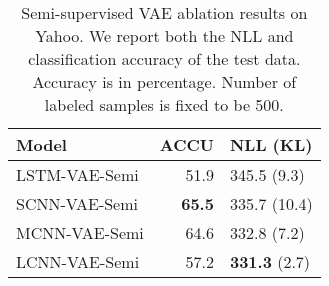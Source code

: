 \documentclass{article}
\begin{document}
\begin{table}[!thp]
\small
  \centering
  \begin{tabular}{l r l}
    Model & ACCU & NLL (KL) \\
    \toprule
    LSTM-VAE-Semi & 51.9 & 345.5 (9.3) \\
    SCNN-VAE-Semi & {\bf 65.5} & 335.7 (10.4) \\
    MCNN-VAE-Semi & 64.6 & 332.8 (7.2) \\
    LCNN-VAE-Semi & 57.2 & {\bf 331.3} (2.7) \\
    \bottomrule
  \end{tabular}
  \caption{Semi-supervised VAE ablation results on Yahoo.
  We report both the NLL and classification
  accuracy of the test data. Accuracy is in percentage.
  Number of labeled samples is fixed to be 500.}
  \label{tab:yahoosemi_compare}
\end{table}

\begin{table*}[!thp]
\small
  \centering
  \caption{Semi-supervised VAE results on the test set, in percentage.
  LA-LSTM and LM-LSTM come from ~\cite{dai2015semi}, they denotes
  the LSTM is initialized with a sequence autoencoder and a language model.}
  \label{tab:semi}
  \vspace{-0.2cm}
\end{table*}
\end{document}

